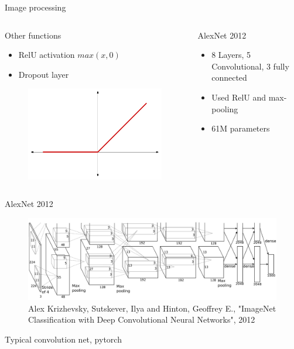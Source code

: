 \begin{frame}{Image processing}
	\begin{columns}
		\begin{column}{.5\textwidth}
			\begin{block}{Other functions}
				\begin{itemize}
					\item RelU activation $max(x,0)$ 
					\item Dropout layer 
				\end{itemize}
				\begin{figure}
					\includegraphics[width=.7\textwidth]{figures/relu}
				\end{figure}
			\end{block}
		\end{column}
		\begin{column}{.5\textwidth}
			\begin{block}{AlexNet 2012}
				\begin{itemize}
					\item 8 Layers, 5 Convolutional, 3 fully connected
					\item Used RelU and max-pooling
					\item 61M parameters
				\end{itemize}
			\end{block}
		\end{column}
	\end{columns}

\end{frame}

\begin{frame}{AlexNet 2012}
	\begin{figure}
		\includegraphics[width=.9\textwidth, center]{figures/alexnet-arch}
		\caption*{Alex Krizhevsky, Sutskever, Ilya and Hinton, Geoffrey E., "ImageNet Classification with Deep Convolutional Neural Networks", 2012 }
	\end{figure}
\end{frame}
\begin{frame}{Typical convolution net, pytorch}
	
\end{frame}


